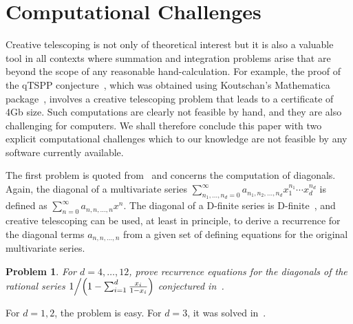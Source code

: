 \documentclass[a4paper,draft]{amsart}
\newtheorem{problem}{Problem}
\begin{document}
 \section{Computational Challenges}

 Creative telescoping is not only of theoretical interest but it is also a valuable tool in all contexts
 where summation and integration problems arise that are beyond the scope of any reasonable hand-calculation.
 For example, the proof of the qTSPP conjecture~\cite{koutschan10a}, which was obtained using Koutschan's Mathematica
 package~\cite{koutschan10c},
 involves a creative telescoping problem that leads to a certificate of 4Gb size. Such computations are clearly
 not feasible by hand, and they are also challenging for computers. We shall therefore conclude this paper
 with two explicit computational challenges which to our knowledge are not feasible by any software currently
 available.

 The first problem is quoted from~\cite{kauers11b} and concerns the computation of diagonals. Again, the diagonal
 of a multivariate series
 $\sum_{n_1,\dots,n_d=0}^\infty a_{n_1,n_2,\dots,n_d}x_1^{n_1}\cdots x_d^{n_d}$ is defined as
 $\sum_{n=0}^\infty a_{n,n,\dots,n} x^n$. The diagonal of a D-finite series is D-finite~\cite{lipshitz88}, and creative
 telescoping can be used, at least in principle, to derive a recurrence for the diagonal terms $a_{n,n,\dots,n}$
 from a given set of defining equations for the original multivariate series.
 \begin{problem}
   For $d=4,\dots,12$, prove recurrence equations for the diagonals of the
   rational series $1\Big/\Bigl(1 - \sum_{i=1}^d\frac{x_i}{1-x_i}\Bigr)$
   conjectured in~\cite{kauers11b}.
 \end{problem}
 For $d=1,2$, the problem is easy. For $d=3$, it was solved in~\cite{bostan11}.
\end{document}
